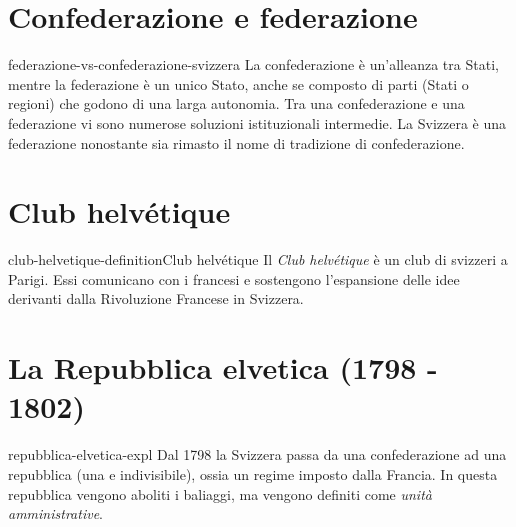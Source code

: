 \documentclass[preview]{standalone}
\begin{document}
\section{Confederazione e federazione}

\begin{snippet}{federazione-vs-confederazione-svizzera}
    La confederazione è un'alleanza tra Stati, mentre la federazione è un unico Stato,
    anche se composto di parti (Stati o regioni) che godono di una larga autonomia.
    Tra una confederazione e una federazione vi sono numerose soluzioni istituzionali intermedie.
    La Svizzera è una federazione nonostante sia rimasto il nome di tradizione di confederazione.
\end{snippet}

\section{Club helvétique}

\begin{snippetdefinition}{club-helvetique-definition}{Club helvétique}
    Il \textit{Club helvétique} è un club di svizzeri a Parigi.
    Essi comunicano con i francesi e sostengono l'espansione delle idee derivanti dalla Rivoluzione Francese
    in Svizzera.
\end{snippetdefinition}

\section{La Repubblica elvetica (1798 - 1802)}

\begin{snippet}{repubblica-elvetica-expl}
    Dal 1798 la Svizzera passa da una confederazione ad una repubblica (una e indivisibile),
    ossia un regime imposto dalla Francia.
    In questa repubblica vengono aboliti i baliaggi, ma vengono definiti come \textit{unità amministrative}.
\end{snippet}

\end{document}

